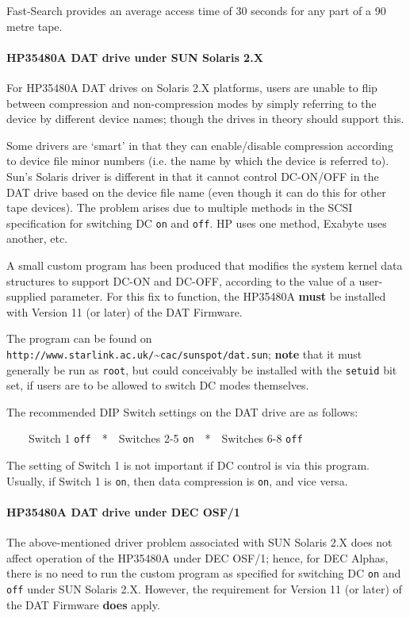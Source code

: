 \documentclass[11pt]{article}
\begin{document}
Fast-Search provides an average access time of 30 seconds for any part of a
90 metre tape.

\paragraph {HP35480A DAT drive under SUN Solaris 2.X}

For HP35480A DAT drives on Solaris 2.X platforms, users are unable to flip
between compression and non-compression modes by simply referring to the
device by different device names; though the drives in theory should support
this.

Some drivers are `smart' in that they can enable/disable compression
according to device file minor numbers (i.e. the name by which the device
is referred to). Sun's Solaris driver is different in that it cannot control
DC-ON/OFF in the DAT drive based on the device file name (even though it can
do this for other tape devices). The problem arises due to multiple methods
in the SCSI specification for switching DC {\tt on} and {\tt off}. HP uses
one method, Exabyte uses another, etc.

A small custom program has been produced that modifies the system kernel
data structures to support DC-ON and DC-OFF, according to the value of a
user-supplied parameter. For this fix to function, the HP35480A {\bf must}
be installed with Version 11 (or later) of the DAT Firmware.

The program can be found on
{\tt http://www.starlink.ac.uk/}\~{ }{\tt cac/sunspot/dat.sun}; {\bf note}
that it must generally be run as {\tt root}, but could conceivably be installed
with the {\tt setuid} bit set, if users are to be allowed to switch DC modes
themselves.

The recommended DIP Switch settings on the DAT drive are as follows:

\ \ \ \ Switch 1 {\tt off}\ \ *\ \ Switches 2-5 {\tt on}\ \ *\ \ Switches
6-8 {\tt off}

The setting of Switch 1 is not important if DC control is via this program.
Usually, if Switch 1 is {\tt on}, then data compression is {\tt on}, and vice
versa.

\paragraph {HP35480A DAT drive under DEC OSF/1}

The above-mentioned driver problem associated with SUN Solaris 2.X does not
affect operation of the HP35480A under DEC OSF/1; hence, for DEC Alphas,
there is no need to run the custom program as specified for switching DC
{\tt on} and {\tt off} under SUN Solaris 2.X. However, the requirement for
Version 11 (or later) of the DAT Firmware {\bf does} apply.
\end{document}

